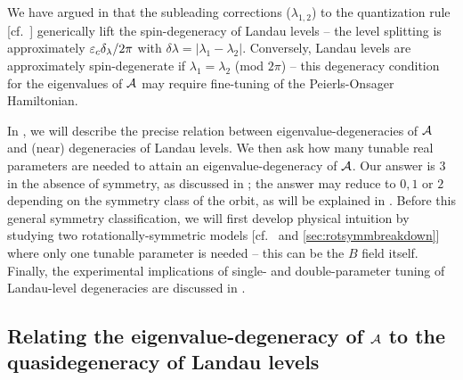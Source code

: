 \documentclass[aps, prb, showpacs, twocolumn, notitlepage, superscriptaddress]{revtex4-1}
\begin{document}
We have argued in  that the subleading corrections ($\lambda_{1,2}$) to the quantization rule [cf.\ ] generically lift the spin-degeneracy of Landau levels -- the level splitting is approximately $\varepsilon_c\delta_\lambda/2\pi$ with $\delta \lambda=|\lambda_1-\lambda_2|$. Conversely, Landau levels are approximately spin-degenerate if $\lambda_1{=}\lambda_2$ (mod $2\pi$) -- this degeneracy condition for the eigenvalues of ${\cal A}$ may require fine-tuning of the Peierls-Onsager Hamiltonian.  

In , we will describe the precise relation between eigenvalue-degeneracies of  ${\cal A}$ and (near) degeneracies of Landau levels. We then ask how many tunable real parameters are needed to attain an eigenvalue-degeneracy of ${\cal A}$. Our answer is  $3$ in the absence of symmetry, as discussed in ; the answer may reduce to $0,1$ or $2$ depending on the symmetry class of the orbit, as will be explained in . Before this general symmetry classification,  we will first develop physical intuition by studying two rotationally-symmetric models [cf.\  and \ref{sec:rotsymmbreakdown}] where only one tunable parameter is needed -- this can be the $B$ field itself. Finally, the experimental implications of single- and double-parameter tuning of Landau-level degeneracies are discussed in .

\subsection{Relating the eigenvalue-degeneracy of ${\cal A}$ to the quasidegeneracy of Landau levels}\label{sec:relatedegeneracies}
\end{document}
